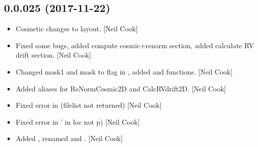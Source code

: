\documentclass[a4paper,10pt,english]{report}
\begin{document}
\subsection{0.0.025 (2017-11-22)}
\label{\detokenize{misc/changelog:id526}}\begin{itemize}
\item {} 
Cosmetic changes to layout. {[}Neil Cook{]}

\item {} 
Fixed some bugs, added compute cosmic+renorm section, added calculate
RV drift section. {[}Neil Cook{]}

\item {} 
Changed mask1 and mask to flag in , added
 and  functions. {[}Neil Cook{]}

\item {} 
Added aliases for ReNormCosmic2D and CalcRVdrift2D. {[}Neil Cook{]}

\item {} 
Fixed error in  (filelist not returned) {[}Neil
Cook{]}

\item {} 
Fixed error in  ’ in loc
not p) {[}Neil Cook{]}

\item {} 
Added , renamed  and . {[}Neil
Cook{]}

\end{itemize}
\end{document}
